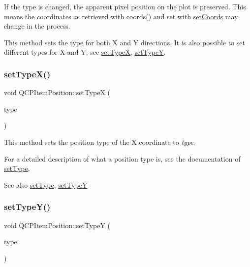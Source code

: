 If the type is changed, the apparent pixel position on the plot is preserved. This means the coordinates as retrieved with coords() and set with \hyperlink{classQCPItemPosition_aa988ba4e87ab684c9021017dcaba945f}{set\+Coords} may change in the process.

This method sets the type for both X and Y directions. It is also possible to set different types for X and Y, see \hyperlink{classQCPItemPosition_a2113b2351d6d00457fb3559a4e20c3ea}{set\+TypeX}, \hyperlink{classQCPItemPosition_ac2a454aa5a54c1615c50686601ec4510}{set\+TypeY}. \mbox{\label{classQCPItemPosition_a2113b2351d6d00457fb3559a4e20c3ea}} 
\subsubsection{\texorpdfstring{set\+Type\+X()}{setTypeX()}}
{\footnotesize\ttfamily void Q\+C\+P\+Item\+Position\+::set\+TypeX (\begin{DoxyParamCaption}\item[{\hyperlink{classQCPItemPosition_aad9936c22bf43e3d358552f6e86dbdc8}{Q\+C\+P\+Item\+Position\+::\+Position\+Type}}]{type }\end{DoxyParamCaption})}

This method sets the position type of the X coordinate to {\itshape type}.

For a detailed description of what a position type is, see the documentation of \hyperlink{classQCPItemPosition_aa476abf71ed8fa4c537457ebb1a754ad}{set\+Type}.

\begin{DoxySeeAlso}{See also}
\hyperlink{classQCPItemPosition_aa476abf71ed8fa4c537457ebb1a754ad}{set\+Type}, \hyperlink{classQCPItemPosition_ac2a454aa5a54c1615c50686601ec4510}{set\+TypeY} 
\end{DoxySeeAlso}
\mbox{\label{classQCPItemPosition_ac2a454aa5a54c1615c50686601ec4510}} 
\subsubsection{\texorpdfstring{set\+Type\+Y()}{setTypeY()}}
{\footnotesize\ttfamily void Q\+C\+P\+Item\+Position\+::set\+TypeY (\begin{DoxyParamCaption}\item[{\hyperlink{classQCPItemPosition_aad9936c22bf43e3d358552f6e86dbdc8}{Q\+C\+P\+Item\+Position\+::\+Position\+Type}}]{type }\end{DoxyParamCaption})}

